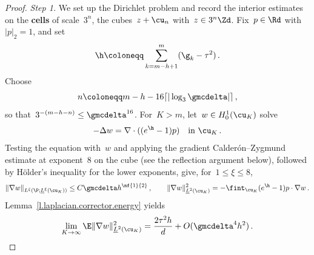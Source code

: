 \documentclass[11pt]{amsart}
\begin{document}
\begin{proof}
	\emph{Step 1.} We set up the Dirichlet problem and record the interior estimates on the \textbf{cells} of scale~$3^n$, the cubes~$z+\cu_n$ with~$z\in3^n\Zd$. Fix~$p\in\Rd$ with~$|p|_2=1$, and set
	\begin{equation}
		\h\coloneqq\sum_{k=m-h+1}^{m}(\g_k-\tau^2)\,.
		\label{e.h.def}
	\end{equation}
	Choose
	\begin{equation}
		n\coloneqq m-h-16\lceil|\log_3\gmcdelta|\rceil\,,
		\label{e.parameter.choice}
	\end{equation}
	so that~$3^{-(m-h-n)}\leq\gmcdelta^{16}$. For~$K>m$, let~$w\in H_0^1(\cu_K)$ solve
	\begin{equation*}
		-\Delta w=\nabla\cdot((e^\h-1)p)
		\quad\text{in }\cu_K\,.
	\end{equation*}
	Testing the equation with~$w$ and applying the gradient Calder\'on--Zygmund estimate at exponent~$8$ on the cube (see the reflection argument below), followed by H\"older's inequality for the lower exponents, give, for~$1\leq\xi\leq8$,
	\begin{equation*}
		\|\nabla w\|_{L^\xi(\P;\underline L^\xi(\cu_K))}
		\leq C\gmcdelta h^{\nf{1}{2}}\,,
		\qquad
		\|\nabla w\|_{\underline L^2(\cu_K)}^2
		=
		-\fint_{\cu_K}(e^\h-1)p\cdot\nabla w\,.
	\end{equation*}
	Lemma~\ref{l.laplacian.corrector.energy} yields
	\begin{equation*}
		\lim_{K\to\infty}
		\E\|\nabla w\|_{\underline L^2(\cu_K)}^2
		=
		\frac{2\tau^2h}{d}+O(\gmcdelta^4h^2)\,.
	\end{equation*}

\smallskip


\end{proof}
\end{document}
